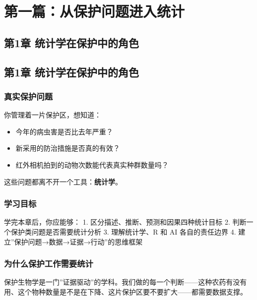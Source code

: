 \documentclass[
  letterpaper,
]{scrbook}
\providecommand{\tightlist}{%
  \setlength{\itemsep}{0pt}\setlength{\parskip}{0pt}}
\begin{document}
\part{第一篇：从保护问题进入统计}

\chapter{第1章
统计学在保护中的角色}\label{ux7b2c1ux7ae0-ux7edfux8ba1ux5b66ux5728ux4fddux62a4ux4e2dux7684ux89d2ux8272}

\chapter{第1章
统计学在保护中的角色}\label{ux7b2c1ux7ae0-ux7edfux8ba1ux5b66ux5728ux4fddux62a4ux4e2dux7684ux89d2ux8272-1}

\section{真实保护问题}\label{ux771fux5b9eux4fddux62a4ux95eeux9898}

你管理着一片保护区，想知道：

\begin{itemize}
\tightlist
\item
  今年的病虫害是否比去年严重？
\item
  新采用的防治措施是否真的有效？
\item
  红外相机拍到的动物次数能代表真实种群数量吗？
\end{itemize}

这些问题都离不开一个工具：\textbf{统计学}。

\section{学习目标}\label{ux5b66ux4e60ux76eeux6807}

学完本章后，你应能够： 1. 区分描述、推断、预测和因果四种统计目标 2.
判断一个保护类问题是否需要统计分析 3. 理解统计学、R 和 AI 各自的责任边界
4. 建立''保护问题→数据→证据→行动''的思维框架

\section{为什么保护工作需要统计}\label{ux4e3aux4ec0ux4e48ux4fddux62a4ux5de5ux4f5cux9700ux8981ux7edfux8ba1}

保护生物学是一门''证据驱动''的学科。我们做的每一个判断------这种农药有没有用、这个物种数量是不是在下降、这片保护区要不要扩大------都需要数据支撑。
\end{document}
